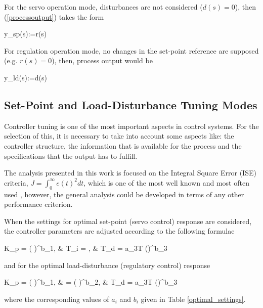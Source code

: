 For the servo operation mode, disturbances are not considered
($d(s)=0$), then (\ref{processoutput}) takes the form

\be
y_{sp}(s):=r(s) \label{servooutput}\ee

For regulation operation mode, no changes in the set-point
reference are supposed (e.g. $r(s)=0$), then, process output would
be

\be y_{ld}(s):=d(s)
\label{regoutput}\ee

\subsection{Set-Point and Load-Disturbance Tuning Modes}
\label{tuning-modes}

Controller tuning is one of the most important aspects in control
systems. For the selection of this, it is necessary to take into
account some aspects like: the controller structure, the
information that is available for the process and the
specifications that the output has to fulfill.

The analysis presented in this work is focused on the Integral
Square Error (ISE) criteria, $J=\int_0^{\infty} e(t)^2 dt$, which
is one of the most well known and most often used
\citep{Astrombook95}, however, the general analysis could be
developed in terms of any other performance criterion.

When the settings for optimal set-point (servo control) response
are considered, the controller parameters are adjusted according
to the following formulae \citep{zhuangAthertonIEE1993}

\bea K_p =  ( \tau )^{b_1},  & \qquad T_i =
, &  \qquad T_d = a_3T (\tau )^{b_3}
\label{set_point_tuning_formulae} \eea

\noindent and for the optimal load-disturbance (regulatory
control) response

\bea K_p =  ( \tau )^{b_1},  & \qquad {} =
( \tau )^{b_2}, & \qquad T_d = a_3T (\tau )^{b_3}
\label{load_disturbance_tuning_formulae} \eea

\noindent where the corresponding values of $a_i$ and $b_i$ given
in Table \ref{optimal_settings}.

